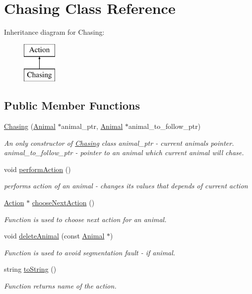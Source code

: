 \hypertarget{class_chasing}{}\section{Chasing Class Reference}
\label{class_chasing}
Inheritance diagram for Chasing\+:\begin{figure}[H]
\begin{center}
\leavevmode
\includegraphics[height=2.000000cm]{class_chasing}
\end{center}
\end{figure}
\subsection*{Public Member Functions}
\begin{DoxyCompactItemize}
\item 
\hyperlink{class_chasing_ad64282bb5e01ec074b3c212a879893b2}{Chasing} (\hyperlink{class_animal}{Animal} $\ast$animal\+\_\+ptr, \hyperlink{class_animal}{Animal} $\ast$animal\+\_\+to\+\_\+follow\+\_\+ptr)
\begin{DoxyCompactList}\small\item\em An only constructor of \hyperlink{class_chasing}{Chasing} class  animal\+\_\+ptr -\/ current animal\textquotesingle{}s pointer.  animal\+\_\+to\+\_\+follow\+\_\+ptr -\/ pointer to an animal which current animal will chase. \end{DoxyCompactList}\item 
void \hyperlink{class_chasing_a244b35d77a91c56686bffe37a50f43d2}{perform\+Action} ()
\begin{DoxyCompactList}\small\item\em performs action of an animal -\/ changes it\textquotesingle{}s values that depends of current action \end{DoxyCompactList}\item 
\hyperlink{class_action}{Action} $\ast$ \hyperlink{class_chasing_a2da36a5808c4ecdca22312ce3d68b651}{choose\+Next\+Action} ()
\begin{DoxyCompactList}\small\item\em Function is used to choose next action for an animal. \end{DoxyCompactList}\item 
void \hyperlink{class_chasing_ac532945a742df4c7a2b73f9bcb93a686}{delete\+Animal} (const \hyperlink{class_animal}{Animal} $\ast$)
\begin{DoxyCompactList}\small\item\em Function is used to avoid segmentation fault -\/ if animal. \end{DoxyCompactList}\item 
string \hyperlink{class_chasing_a94dad51660eda8bb8f7f9b8890bc128e}{to\+String} ()
\begin{DoxyCompactList}\small\item\em Function returns name of the action. \end{DoxyCompactList}\end{DoxyCompactItemize}
